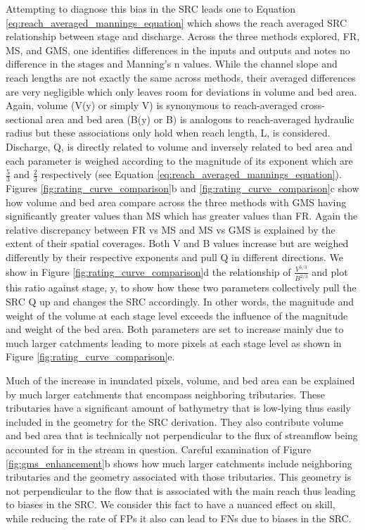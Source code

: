 \documentclass[draft]{dependencies/agujournal2019}
\begin{document}
Attempting to diagnose this bias in the SRC leads one to Equation \ref{eq:reach_averaged_mannings_equation} which shows the reach averaged SRC relationship between stage and discharge.
Across the three methods explored, FR, MS, and GMS, one identifies differences in the inputs and outputs and notes no difference in the stages and Manning's n values.
While the channel slope and reach lengths are not exactly the same across methods, their averaged differences are very negligible which only leaves room for deviations in volume and bed area.
Again, volume (V(y) or simply V) is synonymous to reach-averaged cross-sectional area and bed area (B(y) or B) is analogous to reach-averaged hydraulic radius but these associations only hold when reach length, L, is considered.
Discharge, Q, is directly related to volume and inversely related to bed area and each parameter is weighed according to the magnitude of its exponent which are $\frac{5}{3}$ and $\frac{2}{3}$ respectively (see Equation \ref{eq:reach_averaged_mannings_equation}). 
Figures \ref{fig:rating_curve_comparison}b and \ref{fig:rating_curve_comparison}c show how volume and bed area compare across the three methods with GMS having significantly greater values than MS which has greater values than FR.
Again the relative discrepancy between FR vs MS and MS vs GMS is explained by the extent of their spatial coverages.
Both V and B values increase but are weighed differently by their respective exponents and pull Q in different directions.
We show in Figure \ref{fig:rating_curve_comparison}d the relationship of $\frac{V^{5/3}}{B^{2/3}}$ and plot this ratio against stage, y, to show how these two parameters collectively pull the SRC Q up and changes the SRC accordingly.
In other words, the magnitude and weight of the volume at each stage level exceeds the influence of the magnitude and weight of the bed area.
Both parameters are set to increase mainly due to much larger catchments leading to more pixels at each stage level as shown in Figure \ref{fig:rating_curve_comparison}e.

Much of the increase in inundated pixels, volume, and bed area can be explained by much larger catchments that encompass neighboring tributaries.
These tributaries have a significant amount of bathymetry that is low-lying thus easily included in the geometry for the SRC derivation. 
They also contribute volume and bed area that is technically not perpendicular to the flux of streamflow being accounted for in the stream in question. 
Careful examination of Figure \ref{fig:gms_enhancement}b shows how much larger catchments include neighboring tributaries and the geometry associated with those tributaries. 
This geometry is not perpendicular to the flow that is associated with the main reach thus leading to biases in the SRC.
We consider this fact to have a nuanced effect on skill, while reducing the rate of FPs it also can lead to FNs due to biases in the SRC.
\end{document}

